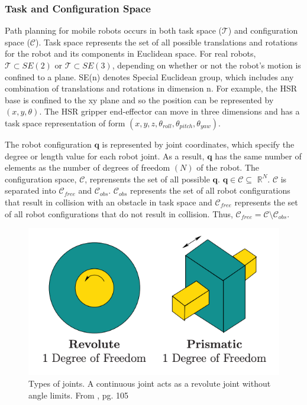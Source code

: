 \documentclass[12pt]{article}
\begin{document}
        \subsubsection{Task and Configuration Space}
            Path planning for mobile robots occurs in both task space ($\mathcal{T}$) and configuration space ($\mathcal{C}$). Task space represents the set of all possible translations and rotations for the robot and its components in Euclidean space. For real robots, $\mathcal{T}\subset SE(2)$ or $\mathcal{T}\subset SE(3)$, depending on whether or not the robot's motion is confined to a plane. SE(n) denotes Special Euclidean group, which includes any combination of translations and rotations in dimension n. For example, the HSR base is confined to the xy plane and so the position can be represented by $(x,y, \theta)$. The HSR gripper end-effector can move in three dimensions and has a task space representation of form $(x,y,z,\theta_{roll}, \theta_{pitch}, \theta_{yaw})$.
            \par The robot configuration $\mathbf{q}$ is represented by joint coordinates, which specify the degree or length value for each robot joint. As a result, $\mathbf{q}$ has the same number of elements as the number of degrees of freedom $(N)$ of the robot. The configuration space, $\mathcal{C}$, reprensents the set of all possible $\mathbf{q}$. $\mathbf{q} \in \mathcal{C} \subseteq$ $\mathbb{R}^{N}$. $\mathcal{C}$ is separated into $\mathcal{C}_{free}$ and $\mathcal{C}_{obs}$. $\mathcal{C}_{obs}$ represents the set of all robot configurations that result in collision with an obstacle in task space and $\mathcal{C}_{free}$ represents the set of all robot configurations that do not result in collision. Thus, $\mathcal{C}_{free} = \mathcal{C} \setminus \mathcal{C}_{obs}$.\cite{lavalle_planning_2006}
            \begin{figure}[ht]
                \includegraphics[width=\linewidth]{screenshots/LaValle_joints}
                \centering
                \caption{Types of joints. A continuous joint acts as a revolute joint without angle limits. From \cite{lavalle_planning_2006}, pg. 105}
                \label{fig:joints_image}
            \end{figure}
\end{document}
